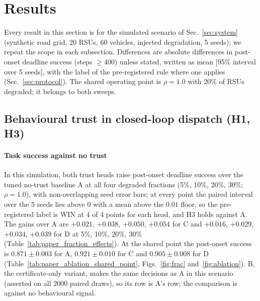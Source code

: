 \section{Results}
\label{sec:results}

Every result in this section is for the simulated scenario of Sec.~\ref{sec:system} (synthetic road grid, 20 RSUs, 60 vehicles, injected degradation, 5 seeds); we repeat the scope in each subsection.
Differences are absolute differences in post-onset deadline success (steps $\ge 400$) unless stated, written as mean [95\% interval over 5 seeds], with the label of the pre-registered rule where one applies (Sec.~\ref{sec:protocol}).
The shared operating point is $\rho=1.0$ with 20\% of RSUs degraded; it belongs to both sweeps.

\subsection{Behavioural trust in closed-loop dispatch (H1, H3)}
\label{sec:behav}

\paragraph*{Task success against no trust}
In this simulation, both trust heads raise post-onset deadline success over the tuned no-trust baseline A at all four degraded fractions (5\%, 10\%, 20\%, 30\%; $\rho=1.0$), with non-overlapping seed error bars; at every point the paired interval over the 5 seeds lies above $0$ with a mean above the $0.01$ floor, so the pre-registered label is WIN at 4 of 4 points for each head, and H3 holds against A.
The gains over A are $+0.021$, $+0.038$, $+0.050$, $+0.054$ for C and $+0.016$, $+0.029$, $+0.034$, $+0.039$ for D at 5\%, 10\%, 20\%, 30\% (Table~\ref{tab:paper_fraction_effects}).
At the shared point the post-onset success is $0.871\pm0.003$ for A, $0.921\pm0.010$ for C and $0.905\pm0.008$ for D (Table~\ref{tab:paper_ablation_shared_point}, Figs.~\ref{fig:frac} and~\ref{fig:ablation}).
B, the certificate-only variant, makes the same decisions as A in this scenario (asserted on all 2000 paired draws), so its row is A's row; the comparison is against no behavioural signal.

